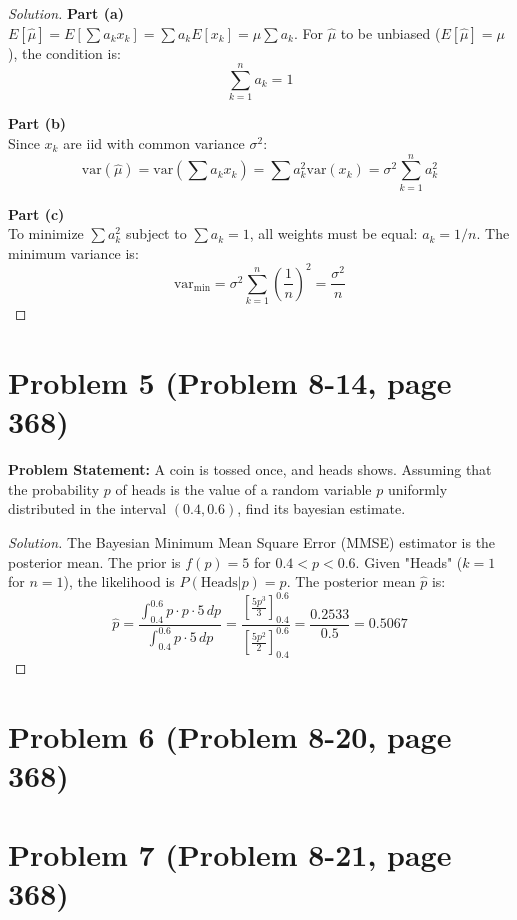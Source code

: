 \documentclass{article}
\begin{document}
\begin{proof}[Solution]
	\textbf{Part (a)}\\
	$E[\hat{\mu}] = E[\sum a_k x_k] = \sum a_k E[x_k] = \mu \sum a_k$. For $\hat{\mu}$ to be unbiased ($E[\hat{\mu}] = \mu$), the condition is:
	\[ \sum_{k=1}^n a_k = 1 \]
	
	\textbf{Part (b)}\\
	Since $x_k$ are iid with common variance $\sigma^2$:
	\[ \text{var}(\hat{\mu}) = \text{var}\left( \sum a_k x_k \right) = \sum a_k^2 \text{var}(x_k) = \sigma^2 \sum_{k=1}^n a_k^2 \]
	
	\textbf{Part (c)}\\
	To minimize $\sum a_k^2$ subject to $\sum a_k = 1$, all weights must be equal: $a_k = 1/n$. The minimum variance is:
	\[ \text{var}_{\min} = \sigma^2 \sum_{k=1}^n \left( \frac{1}{n} \right)^2 = \frac{\sigma^2}{n} \]
\end{proof}

\vspace{1cm}

\section*{Problem 5 (Problem 8-14, page 368)}
\textbf{Problem Statement:}
A coin is tossed once, and heads shows. Assuming that the probability $p$ of heads is the value of a random variable $p$ uniformly distributed in the interval $(0.4, 0.6)$, find its bayesian estimate.

\begin{proof}[Solution]
	The Bayesian Minimum Mean Square Error (MMSE) estimator is the posterior mean. The prior is $f(p) = 5$ for $0.4 < p < 0.6$. Given "Heads" ($k=1$ for $n=1$), the likelihood is $P(\text{Heads} | p) = p$.
	The posterior mean $\hat{p}$ is:
	\[ \hat{p} = \frac{\int_{0.4}^{0.6} p \cdot p \cdot 5 \, dp}{\int_{0.4}^{0.6} p \cdot 5 \, dp} = \frac{\left[ \frac{5p^3}{3} \right]_{0.4}^{0.6}}{\left[ \frac{5p^2}{2} \right]_{0.4}^{0.6}} = \frac{0.2533}{0.5} = 0.5067 \]
\end{proof}

\vspace{1cm}

\section*{Problem 6 (Problem 8-20, page 368)}
\section*{Problem 7 (Problem 8-21, page 368)}
\end{document}
